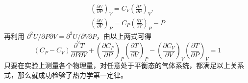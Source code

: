 \begin{align}
\left(\frac{\partial U}{\partial P}\right)_V=C_V\left(\frac{\partial T}{\partial P}\right)_V,\\ 
\left(\frac{\partial U}{\partial V}\right)_P=C_P\left(\frac{\partial T}{\partial V}\right)_P-P
\end{align}
再利用 $\partial^2 U/\partial P\partial V=\partial^2 U/\partial V\partial P$，由以上两式可得
\begin{equation}
(C_P-C_V)\frac{\partial^2T}{\partial P\partial V}+\left(\frac{\partial C_P}{\partial P}\right)_P\left(\frac{\partial T}{\partial V}\right)_P-\left(\frac{\partial C_V}{\partial V}\right)_V\left(\frac{\partial T}{\partial P}\right)_V=1
\end{equation}
只要在实验上测量各个物理量，对任意处于平衡态的气体系统，都满足以上关系式，那么就成功检验了热力学第一定律。
